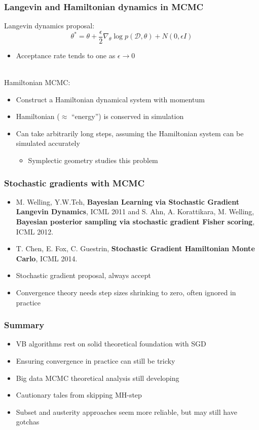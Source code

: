 \documentclass{beamer}
\newcommand{\dataset}{\mathcal{D}}
\newcommand{\parameters}{\theta}
\begin{document}
\begin{frame}
  \frametitle{Langevin and Hamiltonian dynamics in MCMC}

  Langevin dynamics proposal:
  $$ \parameters^* = \parameters + \frac{\epsilon}{2} \nabla_\parameters \log p(\dataset, \parameters) + N(0, \epsilon I) $$
  \begin{itemize}
  \item Acceptance rate tends to one as $\epsilon \rightarrow 0$
  \end{itemize}
  \mbox{}\\
  Hamiltonian MCMC:
  \begin{itemize}
  \item Construct a Hamiltonian dynamical system with momentum
  \item Hamiltonian ($\approx$ ``energy'') is conserved in simulation
  \item Can take arbitrarily long steps, assuming the Hamiltonian
    system can be simulated accurately
    \begin{itemize}
    \item Symplectic geometry studies this problem
    \end{itemize}
  \end{itemize}
\end{frame}

\begin{frame}[allowframebreaks]
  \frametitle{Stochastic gradients with MCMC}

  \begin{itemize}
  \item M. Welling, Y.W.Teh, \textbf{Bayesian Learning via Stochastic Gradient Langevin Dynamics}, ICML 2011 and S. Ahn, A. Korattikara, M. Welling, \textbf{Bayesian posterior sampling via stochastic gradient Fisher scoring}, ICML 2012.
  \item T. Chen, E. Fox, C. Guestrin, \textbf{Stochastic Gradient Hamiltonian Monte Carlo}, ICML 2014.
  \end{itemize}

  \begin{itemize}
  \item Stochastic gradient proposal, always accept
  \item Convergence theory needs step sizes shrinking to zero, often
    ignored in practice
  \end{itemize}
\end{frame}


\begin{frame}
  \frametitle{Summary}

  \begin{itemize}
  \item VB algorithms rest on solid theoretical foundation with SGD
  \item Ensuring convergence in practice can still be tricky
  \item Big data MCMC theoretical analysis still developing
  \item Cautionary tales from skipping MH-step
  \item Subset and austerity approaches seem more reliable, but may
    still have gotchas
  \end{itemize}
\end{frame}
\end{document}
